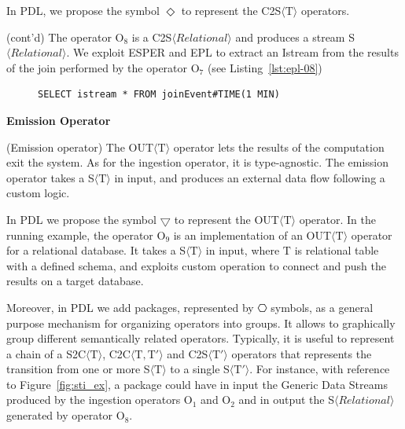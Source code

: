 \noindent
In PDL, we propose the symbol $\Diamond$ to represent the C2S$\langle\mathrm{T}\rangle$ operators. 

\begin{Example}
(cont'd) The operator O$_8$ is a C2S$\langle Relational \rangle$ and produces a stream S$\langle Relational \rangle$. We exploit ESPER and EPL to extract an Istream from the results of the join performed by the operator O$_7$ (see Listing~\ref{lst:epl-08})

\begin{figure}[ht]
\begin{minipage}{0.95\linewidth}
\begin{lstlisting}[caption={EPL query, applied by O$_8$ operator, to create a stream after the join operation.},label=lst:epl-08,style=ESPER]
     SELECT istream * FROM joinEvent#TIME(1 MIN)
\end{lstlisting}
\end{minipage}
\end{figure}
\end{Example}

\medskip
\noindent
\textbf{Emission Operator}
\medskip

\begin{Definition}
(Emission operator) The OUT$\langle\mathrm{T}\rangle$ operator lets the results of the computation exit the system. As for the ingestion operator, it is type-agnostic. The emission operator takes a S$\langle\mathrm{T}\rangle$ in input, and produces an external data flow following a custom logic.
\end{Definition}

\noindent
In PDL we propose the symbol $\bigtriangledown$ to represent the OUT$\langle\mathrm{T}\rangle$ operator. 
In the running example, the operator O$_9$ is an implementation of an OUT$\langle\mathrm{T}\rangle$ operator for a relational database. It takes a S$\langle\mathrm{T}\rangle$ in input, where $\mathrm{T}$ is relational table with a defined schema, and exploits custom operation to connect and push the results on a target database. 

Moreover, in PDL we add packages, represented by $\hexagon$ symbols, as a general purpose mechanism for organizing \river{} operators into groups. It allows to graphically group different semantically related operators.
Typically, it is useful to represent a chain of a S2C$\langle\mathrm{T}\rangle$, C2C$\langle\mathrm{T},\mathrm{T}'\rangle$ and C2S$\langle\mathrm{T}'\rangle$ operators that represents the transition from one or more S$\langle\mathrm{T}\rangle$ to a single S$\langle\mathrm{T}'\rangle$.
For instance, with reference to Figure~\ref{fig:sti_ex}, a package could have in input the Generic Data Streams produced by the ingestion operators O$_1$ and O$_2$ and in output the S$\langle Relational \rangle$ generated by operator O$_8$.

